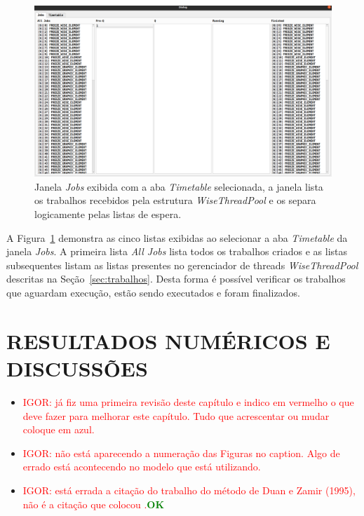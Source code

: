 \documentclass[a4paper,12pt]{monografia}
\theoremstyle{plain}
\theoremstyle{definition}
\theoremstyle{remark}
\begin{document}
\begin{figure}[!htbp]
\centering
\includegraphics[width=\linewidth]{Figures/IGU_022.png}
\caption{Janela \textit{Jobs} exibida com a aba \textit{Timetable} selecionada, a janela lista os trabalhos recebidos pela estrutura \textit{WiseThreadPool} e os separa logicamente pelas listas de espera.}
\label{fig:jobs2}
\end{figure}

A Figura~\ref{fig:jobs2} demonstra as cinco listas exibidas ao selecionar a aba \textit{Timetable} da janela \textit{Jobs}. A primeira lista \textit{All Jobs} lista todos os trabalhos criados e as listas subsequentes listam as listas presentes no gerenciador de threads \textit{WiseThreadPool} descritas na Seção~\ref{sec:trabalhos}. Desta forma é possível verificar os trabalhos que aguardam execução, estão sendo executados e foram finalizados.

\chapter{RESULTADOS NUMÉRICOS E DISCUSSÕES}

\begin{itemize}
	\item \textcolor{red}{IGOR: já fiz uma primeira revisão deste capítulo e indico em vermelho o que deve fazer para melhorar este capítulo. Tudo que acrescentar ou mudar coloque em azul.}
	\item \textcolor{red}{IGOR: não está aparecendo a numeração das Figuras no caption. Algo de errado está acontecendo no modelo que está utilizando.}
	\item \textcolor{red}{IGOR: está errada a citação do trabalho do método de Duan e Zamir (1995), não é a citação que colocou \cite{Duan}.}\textcolor{green}{\textbf{OK}}
\end{itemize}
\end{document}
